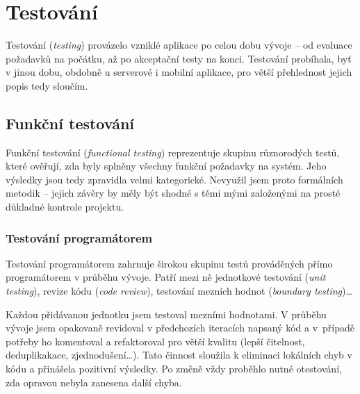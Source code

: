 
\chapter{Testování}
Testování (\textit{testing}) provázelo vzniklé aplikace po celou dobu vývoje -- od evaluace požadavků na počátku, až po akceptační testy na konci. Testování probíhala, byť v jinou dobu, obdobně u serverové i mobilní aplikace, pro větší přehlednost jejich popis tedy sloučím.

\section{Funkční testování}
Funkční testování (\textit{functional testing}) reprezentuje skupinu různorodých testů, které ověřují, zda byly splněny všechny funkční požadavky na systém. Jeho výsledky jsou tedy zpravidla velmi kategorické. Nevyužil jsem proto formálních metodik -- jejich závěry by měly být shodné s těmi mými založenými na prosté důkladné kontrole projektu.

\subsection{Testování programátorem}
Testování programátorem zahrnuje širokou skupinu testů prováděných přímo programátorem v průběhu vývoje. Patří mezi ně jednotkové testování (\textit{unit testing}), revize kódu (\textit{code review}), testování mezních hodnot (\textit{boundary testing})\dots

Každou přidávanou jednotku jsem testoval mezními hodnotami. V průběhu vývoje jsem opakovaně revidoval v předchozích iteracích napsaný kód a v~případě potřeby ho komentoval a refaktoroval pro větší kvalitu (lepší čitelnost, deduplikakace, zjednodušení\dots). Tato činnost sloužila k eliminaci lokálních chyb v kódu a přinášela pozitivní výsledky. Po změně vždy proběhlo nutné otestování, zda opravou nebyla zanesena další chyba.




